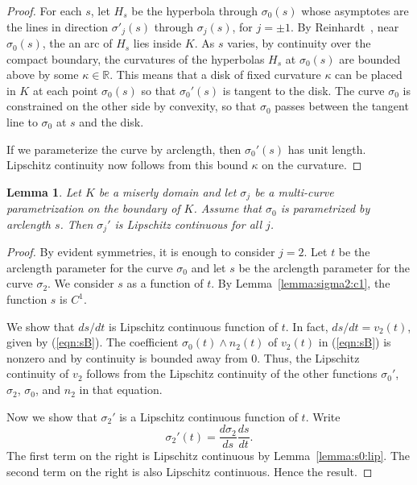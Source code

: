 \documentclass[11pt]{amsart}
\newtheorem{lemma}[equation]{Lemma}
\newcommand{\ring}[1]{\mathbb{#1}}
\begin{document}
\begin{proof} For each $s$, let $H_s$ be the hyperbola through
  $\sigma_0(s)$ whose asymptotes are the lines in direction
  $\sigma'_j(s)$ through $\sigma_j(s)$, for $j=\pm 1$.  By
  Reinhardt~\cite[p.220]{R}, near $\sigma_0(s)$, the an arc of $H_s$
  lies inside $K$.  As $s$ varies, by continuity over the compact
  boundary, the curvatures of the hyperbolas $H_s$ at $\sigma_0(s)$
  are bounded above by some $\kappa\in \ring{R}$.  This means that a
  disk of fixed curvature $\kappa$ can be placed in $K$ at each point
  $\sigma_0(s)$ so that $\sigma_0'(s)$ is tangent to the disk.  The
  curve $\sigma_0$ is constrained on the other side by convexity, so
  that $\sigma_0$ passes between the tangent line to $\sigma_0$ at $s$
  and the disk.

  If we parameterize the curve by arclength, then $\sigma_0'(s)$ has unit length.
  Lipschitz continuity now follows from this bound $\kappa$ on the curvature.
\end{proof}


\begin{lemma}\label{lemma:sj:lip}
  Let $K$ be a miserly domain and let $\sigma_j$ be a multi-curve
  parametrization on the boundary of $K$.  Assume that $\sigma_0$ is
  parametrized by arclength $s$.  Then $\sigma_j'$ is Lipschitz
  continuous for all $j$.
\end{lemma}

\begin{proof}
By evident symmetries, it is enough to consider $j=2$.
Let $t$ be the arclength parameter for the curve $\sigma_0$ and let $s$ be
the arclength parameter for the curve $\sigma_2$. We consider $s$ as a function of $t$.
By Lemma~\ref{lemma:sigma2:c1}, the function $s$ is $C^1$.

We show that $ds/dt$ is Lipschitz continuous function of $t$.  In
fact, $ds/dt=v_2(t)$, given by (\ref{eqn:sB}).  The coefficient
$\sigma_0(t)\land n_2(t)$ of $v_2(t)$ in (\ref{eqn:sB}) is nonzero and
by continuity is bounded away from $0$.  Thus, the Lipschitz
continuity of $v_2$ follows from the Lipschitz continuity of the other
functions $\sigma_0'$, $\sigma_2$, $\sigma_0$, and $n_2$ in that
equation.

Now we show that $\sigma_2'$ is a Lipschitz continuous function of $t$.
Write
\[
\sigma_2'(t) = \frac{d\sigma_2}{d s} \frac{ds}{dt}.
\]
The first term on the right is Lipschitz continuous by Lemma~\ref{lemma:s0:lip}.  The
second term on the right is also Lipschitz continuous.  Hence the result.
\end{proof}
\end{document}
